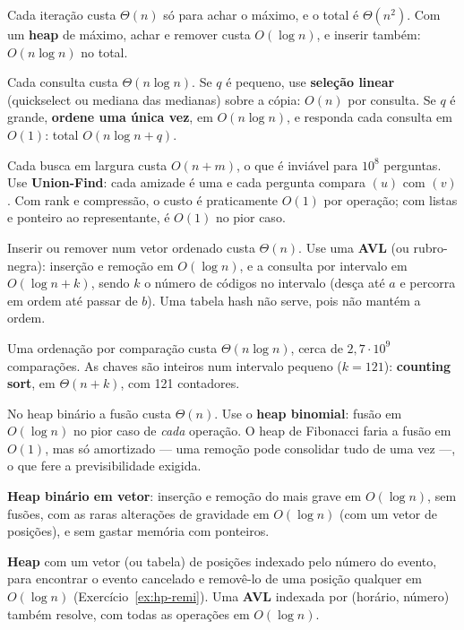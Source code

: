  Cada iteração custa $\Theta(n)$ só para achar o máximo, e o total é $\Theta(n^2)$. Com um \textbf{heap} de máximo, achar e remover custa $O(\log n)$, e inserir também: $O(n\log n)$ no total.

 Cada consulta custa $\Theta(n\log n)$. Se $q$ é pequeno, use \textbf{seleção linear} (quickselect ou mediana das medianas) sobre a cópia: $O(n)$ por consulta. Se $q$ é grande, \textbf{ordene uma única vez}, em $O(n\log n)$, e responda cada consulta em $O(1)$: total $O(n\log n+q)$.

 Cada busca em largura custa $O(n+m)$, o que é inviável para $10^8$ perguntas. Use \textbf{Union-Find}: cada amizade é uma \Union{} e cada pergunta compara \Find$(u)$ com \Find$(v)$. Com rank e compressão, o custo é praticamente $O(1)$ por operação; com listas e ponteiro ao representante, \Find{} é $O(1)$ no pior caso.

 Inserir ou remover num vetor ordenado custa $\Theta(n)$. Use uma \textbf{AVL} (ou rubro-negra): inserção e remoção em $O(\log n)$, e a consulta por intervalo em $O(\log n+k)$, sendo $k$ o número de códigos no intervalo (desça até $a$ e percorra em ordem até passar de $b$). Uma tabela hash não serve, pois não mantém a ordem.

 Uma ordenação por comparação custa $\Theta(n\log n)$, cerca de $2{,}7\cdot10^9$ comparações. As chaves são inteiros num intervalo pequeno ($k=121$): \textbf{counting sort}, em $\Theta(n+k)$, com 121 contadores.

 No heap binário a fusão custa $\Theta(n)$. Use o \textbf{heap binomial}: fusão em $O(\log n)$ no pior caso de \emph{cada} operação. O heap de Fibonacci faria a fusão em $O(1)$, mas só amortizado --- uma remoção pode consolidar tudo de uma vez ---, o que fere a previsibilidade exigida.

 \textbf{Heap binário em vetor}: inserção e remoção do mais grave em $O(\log n)$, sem fusões, com as raras alterações de gravidade em $O(\log n)$ (com um vetor de posições), e sem gastar memória com ponteiros.

 \textbf{Heap} com um vetor (ou tabela) de posições indexado pelo número do evento, para encontrar o evento cancelado e removê-lo de uma posição qualquer em $O(\log n)$ (Exercício~\ref{ex:hp-remi}). Uma \textbf{AVL} indexada por (horário, número) também resolve, com todas as operações em $O(\log n)$.

